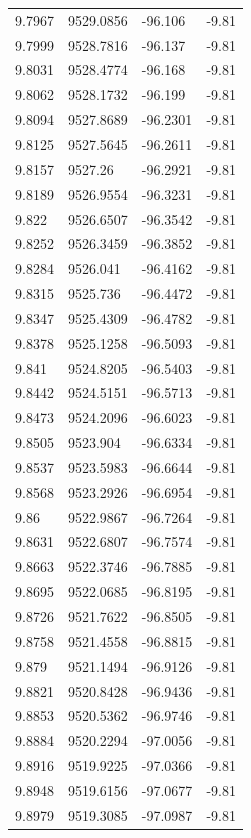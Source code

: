 \begin{table}[H]
\begin{tabular}{llll}
9.7967 & 9529.0856 & -96.106 & -9.81 \\
9.7999 & 9528.7816 & -96.137 & -9.81 \\
9.8031 & 9528.4774 & -96.168 & -9.81 \\
9.8062 & 9528.1732 & -96.199 & -9.81 \\
9.8094 & 9527.8689 & -96.2301 & -9.81 \\
9.8125 & 9527.5645 & -96.2611 & -9.81 \\
9.8157 & 9527.26 & -96.2921 & -9.81 \\
9.8189 & 9526.9554 & -96.3231 & -9.81 \\
9.822 & 9526.6507 & -96.3542 & -9.81 \\
9.8252 & 9526.3459 & -96.3852 & -9.81 \\
9.8284 & 9526.041 & -96.4162 & -9.81 \\
9.8315 & 9525.736 & -96.4472 & -9.81 \\
9.8347 & 9525.4309 & -96.4782 & -9.81 \\
9.8378 & 9525.1258 & -96.5093 & -9.81 \\
9.841 & 9524.8205 & -96.5403 & -9.81 \\
9.8442 & 9524.5151 & -96.5713 & -9.81 \\
9.8473 & 9524.2096 & -96.6023 & -9.81 \\
9.8505 & 9523.904 & -96.6334 & -9.81 \\
9.8537 & 9523.5983 & -96.6644 & -9.81 \\
9.8568 & 9523.2926 & -96.6954 & -9.81 \\
9.86 & 9522.9867 & -96.7264 & -9.81 \\
9.8631 & 9522.6807 & -96.7574 & -9.81 \\
9.8663 & 9522.3746 & -96.7885 & -9.81 \\
9.8695 & 9522.0685 & -96.8195 & -9.81 \\
9.8726 & 9521.7622 & -96.8505 & -9.81 \\
9.8758 & 9521.4558 & -96.8815 & -9.81 \\
9.879 & 9521.1494 & -96.9126 & -9.81 \\
9.8821 & 9520.8428 & -96.9436 & -9.81 \\
9.8853 & 9520.5362 & -96.9746 & -9.81 \\
9.8884 & 9520.2294 & -97.0056 & -9.81 \\
9.8916 & 9519.9225 & -97.0366 & -9.81 \\
9.8948 & 9519.6156 & -97.0677 & -9.81 \\
9.8979 & 9519.3085 & -97.0987 & -9.81 \\

\end{tabular}
\end{table}
